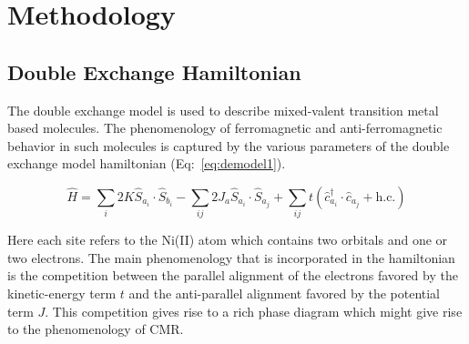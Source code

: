 \documentclass[12pt,twoside]{report}
\begin{document}
	\chapter{Methodology}
	\section{Double Exchange Hamiltonian}

	The double exchange model is used to describe mixed-valent transition metal
	based molecules. The phenomenology of ferromagnetic and anti-ferromagnetic
	behavior in such molecules is captured by the various parameters of the
	double exchange model hamiltonian (Eq:~\ref{eq:demodel1}).
	
	\begin{equation}
			\hat{H}  = \sum_i 2K \hat{S}_{a_i}\cdot\hat{S}_{b_i} 
			- \sum_{ij} 2J_a \hat{S}_{a_i}\cdot\hat{S}_{a_j}
			+ \sum_{ij} t\left( \hat{c}^{\dagger}_{a_i}\cdot\hat{c}_{a_j} + \text{h.c.}\right )
		\label{eq:demodel1}
	\end{equation}
	
	Here each site refers to the Ni(II) atom which contains two orbitals and one
	or two electrons. The main phenomenology that is incorporated in the
	hamiltonian is the competition between the parallel alignment of the
	electrons favored by the kinetic-energy term $t$ and the anti-parallel
	alignment favored by the potential term $J$. This competition gives rise to
	a rich phase diagram which might give rise to the phenomenology of CMR.
\end{document}
